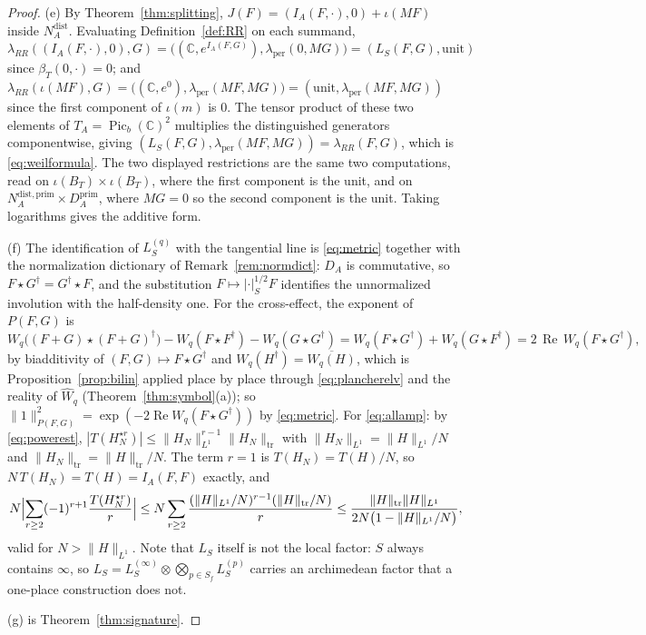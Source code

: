 \documentclass[11pt]{amsart}
\theoremstyle{definition}
\theoremstyle{remark}
\newcommand{\C}{\mathbb C}
\newcommand{\Rel}{\operatorname{Re}}
\newcommand{\Picb}{\operatorname{Pic}_{b}}
\newcommand{\Wh}{\widehat{W}}
\newcommand{\DA}{D_A}
\newcommand{\BT}{B_T}
\newcommand{\NAd}{N_A^{\mathrm{dist}}}
\begin{document}
\begin{proof}
(e)  By Theorem~\ref{thm:splitting}, $J(F)=(I_A(F,\cdot),0)+\iota(MF)$ inside
$\NAd$.  Evaluating Definition~\ref{def:RR} on each summand,
$\lambda_{RR}((I_A(F,\cdot),0),G)=\bigl((\C,e^{I_A(F,G)}),
\lambda_{\mathrm{per}}(0,MG)\bigr)=(L_S(F,G),\mathrm{unit})$ since
$\beta_T(0,\cdot)=0$; and
$\lambda_{RR}(\iota(MF),G)=\bigl((\C,e^{0}),\lambda_{\mathrm{per}}(MF,MG)\bigr)
=(\mathrm{unit},\lambda_{\mathrm{per}}(MF,MG))$ since the first component of
$\iota(m)$ is $0$.  The tensor product of these two elements of
$T_A=\Picb(\C)^{2}$ multiplies the distinguished generators componentwise,
giving $(L_S(F,G),\lambda_{\mathrm{per}}(MF,MG))=\lambda_{RR}(F,G)$, which is
\eqref{eq:weilformula}.  The two displayed restrictions are the same two
computations, read on $\iota(\BT)\times \iota(\BT)$, where the first component is the
unit, and on $N_A^{\mathrm{dist,prim}}\times\DA^{\mathrm{prim}}$, where $MG=0$
so the second component is the unit.  Taking logarithms gives the additive
form.

(f)  The identification of $L_S^{(q)}$ with the tangential line is
\eqref{eq:metric} together with the normalization dictionary of
Remark~\ref{rem:normdict}: $\DA$ is commutative, so $F\star G^{\dagger}=
G^{\dagger}\star F$, and the substitution $F\mapsto|\cdot|_S^{1/2}F$ identifies
the unnormalized involution with the half-density one.  For the cross-effect, the exponent of $P(F,G)$ is
\[
W_q\bigl((F+G)\star(F+G)^{\dagger}\bigr)-W_q(F\star F^{\dagger})
-W_q(G\star G^{\dagger})=W_q(F\star G^{\dagger})+W_q(G\star F^{\dagger})
=2\,\Rel\,W_q(F\star G^{\dagger}),
\]
by biadditivity of $(F,G)\mapsto F\star G^{\dagger}$ and
$W_q(H^{\dagger})=\overline{W_q(H)}$, which is
Proposition~\ref{prop:bilin} applied place by place through
\eqref{eq:plancherelv} and the reality of $\Wh_q$ (Theorem~\ref{thm:symbol}(a));
so $\lVert1\rVert^{2}_{P(F,G)}=\exp(-2\Rel W_q(F\star G^{\dagger}))$ by
\eqref{eq:metric}.  For \eqref{eq:allamp}: by
\eqref{eq:powerest}, $|T(H_N^{\star r})|\le\lVert H_N\rVert_{L^1}^{r-1}
\lVert H_N\rVert_{\mathrm{tr}}$ with $\lVert H_N\rVert_{L^1}=\lVert
H\rVert_{L^1}/N$ and $\lVert H_N\rVert_{\mathrm{tr}}=\lVert
H\rVert_{\mathrm{tr}}/N$.  The term $r=1$ is $T(H_N)=T(H)/N$, so
$N\,T(H_N)=T(H)=I_A(F,F)$ exactly, and
\[
N\Bigl|\sum_{r\ge2}(-1)^{r+1}\frac{T(H_N^{\star r})}{r}\Bigr|
\le N\sum_{r\ge2}\frac{(\lVert H\rVert_{L^1}/N)^{r-1}
(\lVert H\rVert_{\mathrm{tr}}/N)}{r}
\le\frac{\lVert H\rVert_{\mathrm{tr}}\lVert H\rVert_{L^1}}
{2N\bigl(1-\lVert H\rVert_{L^1}/N\bigr)},
\]
valid for $N>\lVert H\rVert_{L^1}$.  Note that $L_S$ itself is not the local
factor: $S$ always contains $\infty$, so
$L_S=L_S^{(\infty)}\otimes\bigotimes_{p\in S_f}L_S^{(p)}$ carries an
archimedean factor that a one-place construction does not.

(g) is Theorem~\ref{thm:signature}.
\end{proof}
\end{document}
